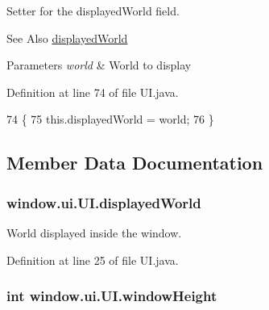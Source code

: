 Setter for the displayed\-World field. 

\begin{DoxySeeAlso}{See Also}
\hyperlink{classwindow_1_1ui_1_1_u_i_a964f2be8f2b13b25d66b571325e20757}{displayed\-World} 
\end{DoxySeeAlso}

\begin{DoxyParams}{Parameters}
{\em world} & World to display \\
\hline
\end{DoxyParams}


Definition at line 74 of file U\-I.\-java.


\begin{DoxyCode}
74                                                \{
75         this.displayedWorld = world;
76     \}
\end{DoxyCode}


\subsection{Member Data Documentation}
\hypertarget{classwindow_1_1ui_1_1_u_i_a964f2be8f2b13b25d66b571325e20757}{
\subsubsection[{displayed\-World}]{ window.\-ui.\-U\-I.\-displayed\-World\hspace{0.3cm}{\ttfamily [protected]}}}\label{classwindow_1_1ui_1_1_u_i_a964f2be8f2b13b25d66b571325e20757}


World displayed inside the window. 



Definition at line 25 of file U\-I.\-java.

\hypertarget{classwindow_1_1ui_1_1_u_i_ad1a84d64616615d037c1ebca54647610}{
\subsubsection[{window\-Height}]{\setlength{\rightskip}{0pt plus 5cm}int window.\-ui.\-U\-I.\-window\-Height\hspace{0.3cm}{\ttfamily [protected]}}}\label{classwindow_1_1ui_1_1_u_i_ad1a84d64616615d037c1ebca54647610}


